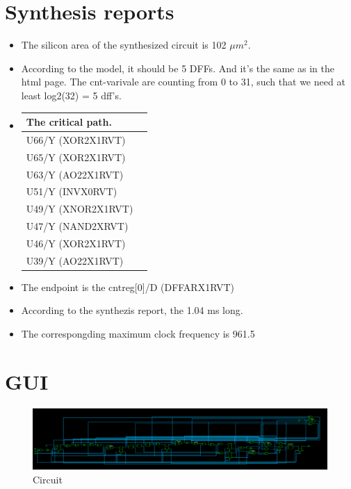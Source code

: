 \documentclass{article}
\begin{document}
\section {Synthesis reports}
\begin{itemize}
\item The silicon area of the synthesized circuit is 102 $\mu m^2$.
\item According to the model, it should be 5 DFFs. And it's the same as in the html page. The cnt-varivale are counting from 0 to 31, such that we need at least log2(32) = 5 dff's. 

 
\item \begin{tabular}{ | l | p{5cm} |}
    \hline
    The critical path.\\ \hline U66/Y (XOR2X1RVT)\\ \hline U65/Y (XOR2X1RVT)\\ \hline U63/Y (AO22X1RVT) \\ \hline U51/Y (INVX0RVT) \\ \hline U49/Y (XNOR2X1RVT) \\ \hline U47/Y (NAND2XRVT) \\ \hline U46/Y (XOR2X1RVT) \\ \hline U39/Y (AO22X1RVT) \\ \hline \end{tabular}

\item  The endpoint is the cnt\textunderscore reg[0]/D (DFFARX1\textunderscore RVT)       
\item  According to the synthezis report, the 1.04 ms long. 
\item  The correspongding maximum clock frequency is 961.5


\end{itemize}


\section {GUI}
\begin{figure}[H]
 \begin {center}
  \includegraphics[scale=0.3]{sirquit.png}
  \caption{Circuit}
  \end{center}
\end{figure}
\end{document}
